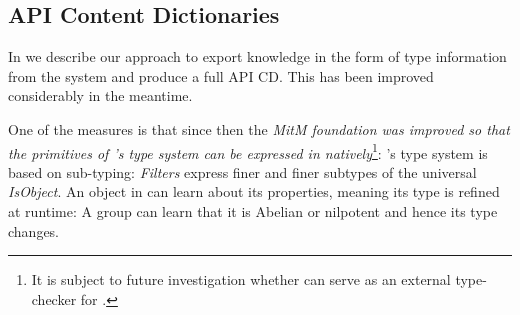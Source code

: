 

\subsection{\GAP API Content Dictionaries}

In \cite{DehKohKon:iop16} we describe our approach to export knowledge in the form of type
information from the \GAP system and produce a full \GAP API CD. This has been
improved considerably in the meantime. 

One of the measures is that since then the \emph{MitM foundation was improved so that the primitives of \GAP's type system can be
  expressed in \OMMT natively}\footnote{It is subject to future investigation whether
  \MMT can serve as an external type-checker for \GAP.}: \GAP's type system is based on
sub-typing: \emph{Filters} express finer and finer subtypes of the universal
\emph{IsObject}. An object in \GAP can learn about its properties, meaning its type is
refined at runtime: A group can learn that it is Abelian or nilpotent and hence its type
changes.

